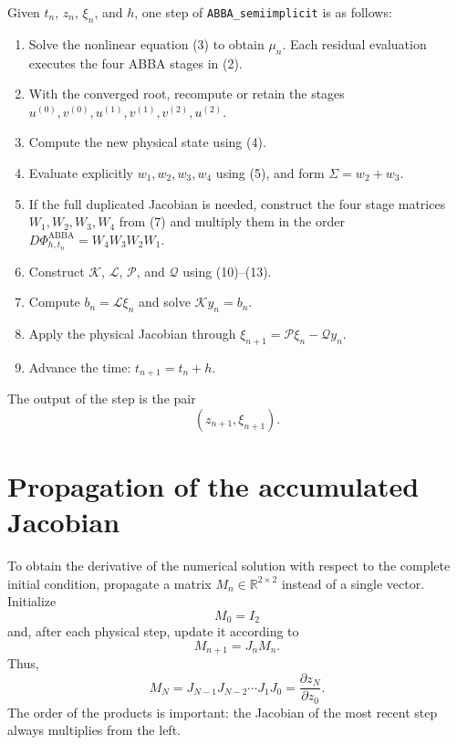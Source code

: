 \documentclass[11pt,a4paper]{article}
\newcommand{\R}{\mathbb{R}}
\newcommand{\PhiAB}{\Phi^{\mathrm{ABBA}}_{h,t_n}}
\begin{document}
Given $t_n$, $z_n$, $\xi_n$, and $h$, one step of \texttt{ABBA\_semiimplicit} is as
follows:

\begin{enumerate}
 \item Solve the nonlinear equation (3) to obtain $\mu_n$. Each residual evaluation
       executes the four ABBA stages in (2).

 \item With the converged root, recompute or retain the stages
       $u^{(0)},v^{(0)},u^{(1)},v^{(1)},v^{(2)},u^{(2)}$.

 \item Compute the new physical state using (4).

 \item Evaluate explicitly $w_1,w_2,w_3,w_4$ using (5), and form
       $\Sigma=w_2+w_3$.

 \item If the full duplicated Jacobian is needed, construct the four stage matrices
       $W_1,W_2,W_3,W_4$ from (7) and multiply them in the order
       $D\PhiAB=W_4W_3W_2W_1$.

 \item Construct $\mathcal K$, $\mathcal L$, $\mathcal P$, and $\mathcal Q$ using
       (10)--(13).

 \item Compute $b_n=\mathcal L\xi_n$ and solve $\mathcal K y_n=b_n$.

 \item Apply the physical Jacobian through
       $\xi_{n+1}=\mathcal P\xi_n-\mathcal Qy_n$.

 \item Advance the time: $t_{n+1}=t_n+h$.
\end{enumerate}

The output of the step is the pair
\[
 \boxed{
 (z_{n+1},\xi_{n+1}).
 }
\]

\section{Propagation of the accumulated Jacobian}

To obtain the derivative of the numerical solution with respect to the complete initial
condition, propagate a matrix $M_n\in\R^{2\times2}$ instead of a single vector. Initialize
\[
 M_0=I_2
\]
and, after each physical step, update it according to
\[
 \boxed{
 M_{n+1}=J_nM_n.
 }
 \tag{18}
\]
Thus,
\[
 M_N=J_{N-1}J_{N-2}\cdots J_1J_0
 =\frac{\partial z_N}{\partial z_0}.
\]
The order of the products is important: the Jacobian of the most recent step always
multiplies from the left.
\end{document}
